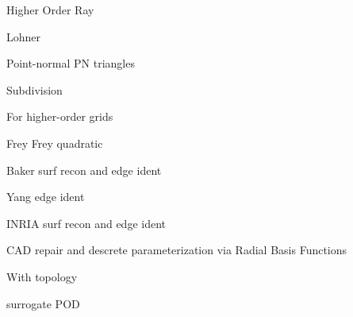 \documentclass{article}
\begin{document}
Higher Order Ray\cite{ray-delany-einstein-jiao-robust-ho-surf-recon-remesh}

Lohner\cite{lohner-regridding-surface}
\cite{kim-takano-nakahashi-adjoint-adapt,kim-nakahashi-adjoint-adapt-viscous}

Point-normal PN triangles\cite{vlachos-curved-pn-triangles}

Subdivision\cite{haimes-imr15-subdivision}

For higher-order grids\cite{unstruct-3d-ho-grid-dg-surf-recon}
\cite{jiao-wang-resonstruct-ho-surf}

Frey\cite{frey-imr9-about-surface-remeshing}
Frey quadratic\cite{dapogny-dobrzynski-frey-3d-adapt-surf-recon}

Baker surf recon and edge ident\cite{baker-imr13}

Yang edge ident\cite{yang-zheng-wang-joint-line-detection-tri}

INRIA surf recon and edge ident\cite{borouchaki-surface-reconstruction}

CAD repair and descrete parameterization via Radial Basis Functions
\cite{cad-repair-discrete-param-rbf}

With topology\cite{lepage-habashi-cad-reconstruction}

surrogate POD\cite{bobrowski-surrogate-geom-pod-adj-opt}



\end{document}
